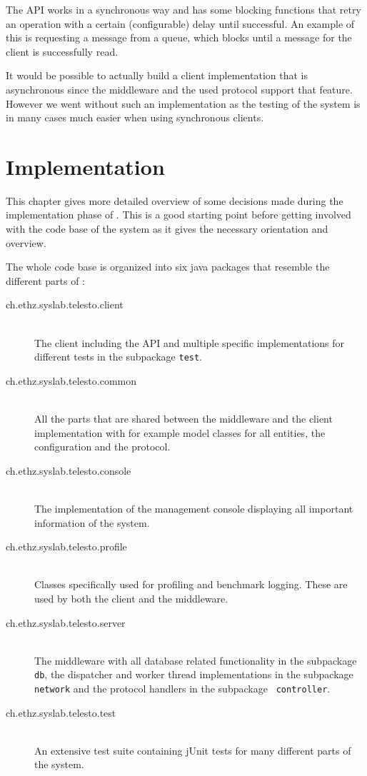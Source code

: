 \documentclass[a4paper, oneside]{csthesis}
\begin{document}
    The API works in a synchronous way and has some blocking functions that
    retry an operation with a certain (configurable) delay until successful. An
    example of this is requesting a message from a queue, which blocks until a
    message for the client is successfully read.
    
    It would be possible to actually build a client implementation that is
    asynchronous since the middleware and the used protocol support that
    feature. However we went without such an implementation as the testing of
    the system is in many cases much easier when using synchronous clients.
    

\chapter{Implementation}
\label{ch:implementation}
This chapter gives more detailed overview of some decisions made during the
implementation phase of \telesto. This is a good starting point before getting
involved with the code base of the system as it gives the necessary orientation
and overview.

The whole code base is organized into six java packages that resemble the
different parts of \telesto:

\begin{description}
\item[ch.ethz.syslab.telesto.client] \ \\
    The \telesto{} client including the API and multiple specific
    implementations for different tests in the subpackage {\tt test}.
\item[ch.ethz.syslab.telesto.common] \ \\
    All the parts that are shared between the middleware and the client
    implementation with for example model classes for all entities, the
    configuration and the protocol.
\item[ch.ethz.syslab.telesto.console] \ \\
    The implementation of the management console displaying all important
    information of the system.
\item[ch.ethz.syslab.telesto.profile] \ \\
    Classes specifically used for profiling and benchmark logging. These are
    used by both the client and the middleware.
\item[ch.ethz.syslab.telesto.server] \ \\
    The \telesto{} middleware with all database related functionality in the
    subpackage {\tt db}, the dispatcher and worker thread implementations in the
    subpackage {\tt network} and the protocol handlers in the subpackage {\tt
    controller}.
\item[ch.ethz.syslab.telesto.test] \ \\
    An extensive test suite containing jUnit tests for many different parts of
    the system.
\end{description}
\end{document}
